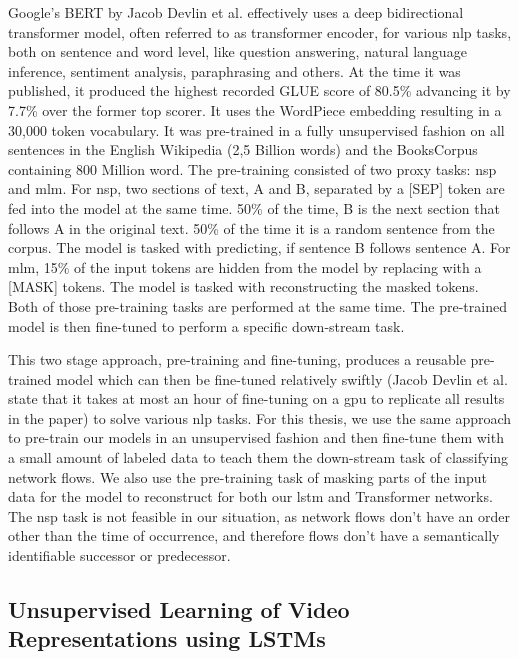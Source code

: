 Google's BERT \cite{bert} by Jacob Devlin et al. effectively uses a deep bidirectional transformer model, often referred to as transformer encoder, for various \gls{nlp} tasks, both on sentence and word level, like question answering, natural language inference, sentiment analysis, paraphrasing and others. At the time it was published, it produced the highest recorded GLUE \cite{glue} score of 80.5\% advancing it by 7.7\% over the former top scorer. It uses the WordPiece \cite{wordpiece} embedding resulting in a 30,000 token vocabulary. It was pre-trained in a fully unsupervised fashion on all sentences in the English Wikipedia (2,5 Billion words) and the BooksCorpus \cite{books_corpus} containing 800 Million word. The pre-training consisted of two proxy tasks: \gls{nsp} and \gls{mlm}. For \gls{nsp}, two sections of text, A and B, separated by a [SEP] token are fed into the model at the same time. 50\% of the time, B is the next section that follows A in the original text. 50\% of the time it is a random sentence from the corpus. The model is tasked with predicting, if sentence B follows sentence A. For \gls{mlm}, 15\% of the input tokens are hidden from the model by replacing with a [MASK] tokens. The model is tasked with reconstructing the masked tokens. Both of those pre-training tasks are performed at the same time. The pre-trained model is then fine-tuned to perform a specific down-stream task. \par
This two stage approach, pre-training and fine-tuning, produces a reusable pre-trained model which can then be fine-tuned relatively swiftly (Jacob Devlin et al. state that it takes at most an hour of fine-tuning on a \gls{gpu} to replicate all results in the paper) to solve various \gls{nlp} tasks. For this thesis, we use the same approach to pre-train our models in an unsupervised fashion and then fine-tune them with a small amount of labeled data to teach them the down-stream task of classifying network flows. We also use the pre-training task of masking parts of the input data for the model to reconstruct for both our \gls{lstm} and Transformer networks. The \gls{nsp} task is not feasible in our situation, as network flows don't have an order other than the time of occurrence, and therefore flows don't have a semantically identifiable successor or predecessor.

\subsection{Unsupervised Learning of Video Representations using LSTMs} \label{sec:stateofart:unsupervised_video_lstm}

